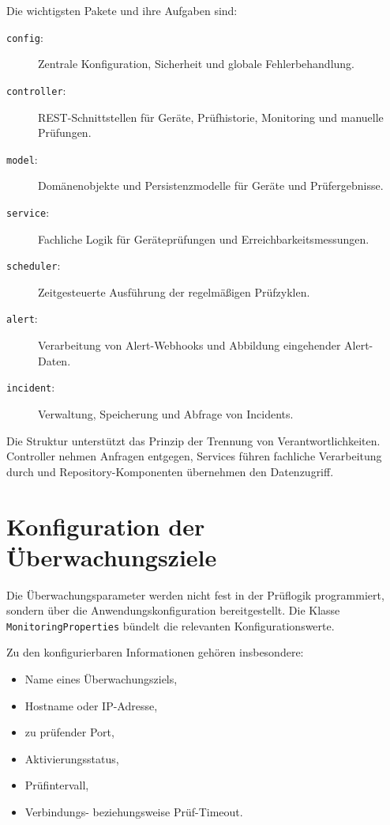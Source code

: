 Die wichtigsten Pakete und ihre Aufgaben sind:

\begin{description}
    \item[\texttt{config}:] Zentrale Konfiguration, Sicherheit und globale Fehlerbehandlung.
    \item[\texttt{controller}:] REST-Schnittstellen für Geräte, Prüfhistorie, Monitoring und manuelle Prüfungen.
    \item[\texttt{model}:] Domänenobjekte und Persistenzmodelle für Geräte und Prüfergebnisse.
    \item[\texttt{service}:] Fachliche Logik für Geräteprüfungen und Erreichbarkeitsmessungen.
    \item[\texttt{scheduler}:] Zeitgesteuerte Ausführung der regelmäßigen Prüfzyklen.
    \item[\texttt{alert}:] Verarbeitung von Alert-Webhooks und Abbildung eingehender Alert-Daten.
    \item[\texttt{incident}:] Verwaltung, Speicherung und Abfrage von Incidents.
\end{description}

Die Struktur unterstützt das Prinzip der Trennung von Verantwortlichkeiten. Controller nehmen Anfragen entgegen, Services führen fachliche Verarbeitung durch und Repository-Komponenten übernehmen den Datenzugriff.

\section{Konfiguration der Überwachungsziele}
\label{sec:konfiguration-ueberwachungsziele}

Die Überwachungsparameter werden nicht fest in der Prüflogik programmiert, sondern über die Anwendungskonfiguration bereitgestellt. Die Klasse \texttt{MonitoringProperties} bündelt die relevanten Konfigurationswerte.

Zu den konfigurierbaren Informationen gehören insbesondere:

\begin{itemize}
    \item Name eines Überwachungsziels,
    \item Hostname oder IP-Adresse,
    \item zu prüfender Port,
    \item Aktivierungsstatus,
    \item Prüfintervall,
    \item Verbindungs- beziehungsweise Prüf-Timeout.
\end{itemize}

